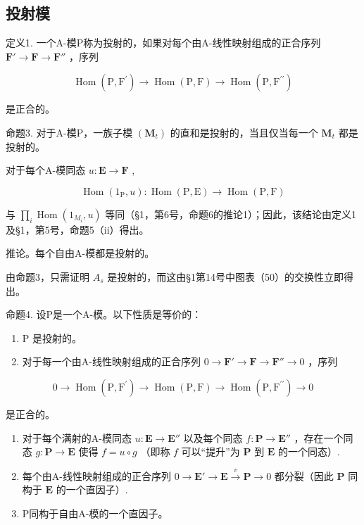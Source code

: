 \subsection{投射模}

定义1. 一个A-模P称为投射的，如果对每个由A-线性映射组成的正合序列 \(\mathbf{F}' \to \mathbf{F} \to \mathbf{F}''\) ，序列

\[
\operatorname{Hom} (\mathrm{P}, \mathrm{F} ^ {\prime}) \rightarrow \operatorname{Hom} (\mathrm{P}, \mathrm{F}) \rightarrow \operatorname{Hom} (\mathrm{P}, \mathrm{F} ^ {\prime \prime})
\]

是正合的。

命题3. 对于A-模P，一族子模 \((\mathbf{M}_{t})\) 的直和是投射的，当且仅当每一个 \(\mathbf{M}_{t}\) 都是投射的。

对于每个A-模同态 \(u: \mathbf{E} \to \mathbf{F}\) ,

\[
\operatorname{Hom} \left(1 _ {\mathrm{P}}, u\right): \operatorname{Hom} (\mathrm{P}, \mathrm{E}) \rightarrow \operatorname{Hom} (\mathrm{P}, \mathrm{F})
\]

与 \(\prod_{i}\operatorname{Hom}(1_{M_i},u)\) 等同（§1，第6号，命题6的推论1）；因此，该结论由定义1及§1，第5号，命题5（ii）得出。

推论。每个自由A-模都是投射的。

由命题3，只需证明 \(A_{s}\) 是投射的，而这由§1第14号中图表（50）的交换性立即得出。

命题4. 设P是一个A-模。以下性质是等价的：

\begin{enumerate}
\def\labelenumi{(\alph{enumi})}
\item
  P 是投射的。
\item
  对于每一个由A-线性映射组成的正合序列 \(0 \to \mathbf{F}' \to \mathbf{F} \to \mathbf{F}'' \to 0\) ，序列
\end{enumerate}

\[
0 \rightarrow \operatorname{Hom} (\mathrm{P}, \mathrm{F} ^ {\prime}) \rightarrow \operatorname{Hom} (\mathrm{P}, \mathrm{F}) \rightarrow \operatorname{Hom} (\mathrm{P}, \mathrm{F} ^ {\prime \prime}) \rightarrow 0
\]

是正合的。

\begin{enumerate}
\def\labelenumi{(\alph{enumi})}
\setcounter{enumi}{2}
\item
  对于每个满射的A-模同态 \(u: \mathbf{E} \to \mathbf{E}''\) 以及每个同态 \(f: \mathbf{P} \to \mathbf{E}''\) ，存在一个同态 \(g: \mathbf{P} \to \mathbf{E}\) 使得 \(f = u \circ g\) （即称 \(f\) 可以“提升”为 \(\mathbf{P}\) 到 \(\mathbf{E}\) 的一个同态）.
\item
  每个由A-线性映射组成的正合序列 \(0 \to \mathbf{E}' \to \mathbf{E} \xrightarrow{v} \mathbf{P} \to 0\) 都分裂（因此 \(\mathbf{P}\) 同构于 \(\mathbf{E}\) 的一个直因子）.
\item
  P同构于自由A-模的一个直因子。
\end{enumerate}


